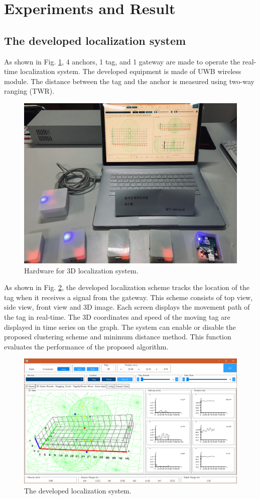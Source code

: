 \documentclass[conference]{IEEEtran}
\begin{document}
\section{Experiments and Result}
\subsection{The developed localization system}

As shown in Fig. \ref{fig10}, 4 anchors, 1 tag, and 1 gateway are made to operate the real-time localization system. The developed equipment is made of UWB wireless module. The distance between the tag and the anchor is measured using two-way ranging (TWR).

\begin{figure}[htbp]
\centerline{\includegraphics[width=0.62\columnwidth]{fig10.jpg}}
\caption{Hardware for 3D localization system.}
\label{fig10}
\end{figure}

As shown in Fig. \ref{fig5}, the developed localization scheme tracks the location of the tag when it receives a signal from the gateway. This scheme consists of top view, side view, front view and 3D image. Each screen displays the movement path of the tag in real-time. The 3D coordinates and speed of the moving tag are displayed in time series on the graph. The system can enable or disable the proposed clustering scheme and minimum distance method. This function evaluates the performance of the proposed algorithm.

\begin{figure}[htbp]
\centerline{\includegraphics[width=0.62\columnwidth]{fig5.png}}
\caption{The developed localization system.}
\label{fig5}
\end{figure}
\end{document}
